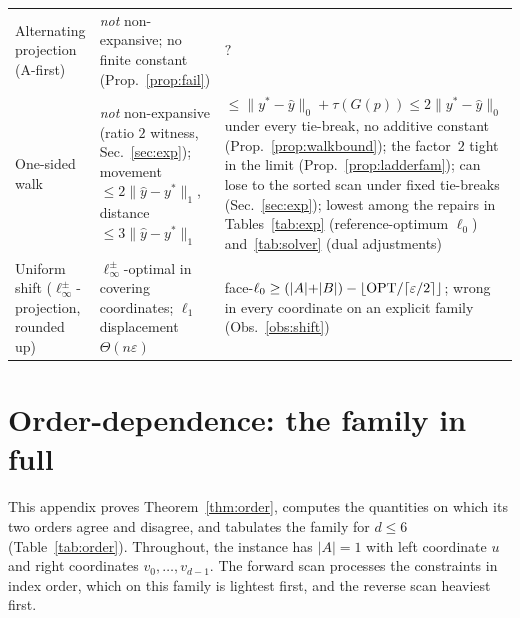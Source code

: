 \begin{table}[!htbp]
\begin{tabular}{@{}p{2.8cm} p{3.8cm} p{6.6cm}@{}}
\raggedright Alternating projection (A-first) & \raggedright \emph{not} non-expansive; no finite constant (Prop.~\ref{prop:fail}) & \raggedright $?$\tabularnewline
\raggedright One-sided walk & \raggedright \emph{not} non-expansive (ratio $2$ witness, Sec.~\ref{sec:exp}); movement $\le 2\|\hat y{-}y^*\|_1$, distance $\le 3\|\hat y{-}y^*\|_1$ & \raggedright $\le \|y^*{-}\hat y\|_0 + \tau(G(p)) \le 2\|y^*{-}\hat y\|_0$ under every tie-break, no additive constant (Prop.~\ref{prop:walkbound}); the factor~$2$ tight in the limit (Prop.~\ref{prop:ladderfam}); can lose to the sorted scan under fixed tie-breaks (Sec.~\ref{sec:exp}); lowest among the repairs in Tables~\ref{tab:exp} (reference-optimum $\ell_0$) and~\ref{tab:solver} (dual adjustments)\tabularnewline
\raggedright Uniform shift ($\ell_\infty^\pm$-projection, rounded up) & \raggedright $\ell_\infty^\pm$-optimal in covering coordinates; $\ell_1$ displacement $\Theta(n\varepsilon)$ & \raggedright face-$\ell_0 \ge (|A|{+}|B|) - \lfloor\mathrm{OPT}/\lceil\varepsilon/2\rceil\rfloor$; wrong in every coordinate on an explicit family (Obs.~\ref{obs:shift})\tabularnewline
\bottomrule
\end{tabular}
\end{table}

\clearpage
\section{Order-dependence: the family in full}\label{app:order}

This appendix proves Theorem~\ref{thm:order}, computes the quantities on which its two orders agree
and disagree, and tabulates the family for $d \le 6$ (Table~\ref{tab:order}). Throughout, the instance has $|A| = 1$ with
left coordinate $u$ and right coordinates $v_0, \dots, v_{d-1}$. The forward scan processes the
constraints in index order, which on this family is lightest first, and the reverse scan heaviest
first.

